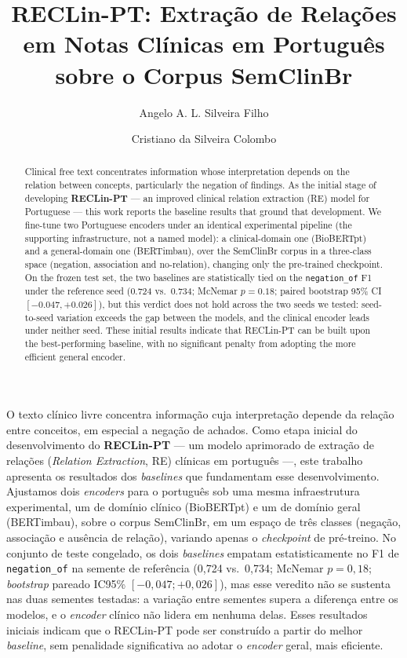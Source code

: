 \documentclass[12pt]{article}
\title{RECLin-PT: Extração de Relações em Notas Clínicas em Português sobre o
Corpus SemClinBr}
\author{Angelo A. L. Silveira Filho\inst{1} \and Cristiano da Silveira
Colombo\inst{1}}
\begin{document}
\maketitle

\begin{abstract}
Clinical free text concentrates information whose interpretation depends on the
relation between concepts, particularly the negation of findings. As the initial
stage of developing \textbf{RECLin-PT} --- an improved clinical relation
extraction (RE) model for Portuguese --- this work reports the baseline results
that ground that development. We fine-tune two Portuguese encoders under an
identical experimental pipeline (the supporting infrastructure, not a named
model): a clinical-domain one (BioBERTpt) and a general-domain one (BERTimbau),
over the SemClinBr corpus in a three-class space (negation, association and
no-relation), changing only the pre-trained checkpoint. On the frozen test set,
the two baselines are statistically tied on the \texttt{negation\_of} F1 under the
reference seed (0.724 vs.\ 0.734; McNemar $p=0.18$; paired bootstrap 95\% CI
$[-0.047,+0.026]$), but this verdict does not hold across the two seeds we tested:
seed-to-seed variation exceeds the gap between the models, and the clinical
encoder leads under neither seed. These initial results
indicate that RECLin-PT can be built upon the best-performing baseline, with no
significant penalty from adopting the more efficient general encoder.
\end{abstract}

\begin{resumo}
O texto clínico livre concentra informação cuja interpretação depende da relação
entre conceitos, em especial a negação de achados. Como etapa inicial do
desenvolvimento do \textbf{RECLin-PT} --- um modelo aprimorado de extração de
relações (\emph{Relation Extraction}, RE) clínicas em português ---, este
trabalho apresenta os resultados dos \emph{baselines} que fundamentam esse
desenvolvimento. Ajustamos dois \emph{encoders} para o português sob uma mesma
infraestrutura experimental, um de domínio clínico (BioBERTpt) e um de domínio
geral (BERTimbau), sobre o corpus SemClinBr, em um espaço de três classes
(negação, associação e ausência de relação), variando apenas o \emph{checkpoint}
de pré-treino. No conjunto de teste congelado, os dois \emph{baselines} empatam
estatisticamente no F1 de \texttt{negation\_of} na semente de referência (0,724
vs.\ 0,734; McNemar $p=0,18$; \emph{bootstrap} pareado IC95\% $[-0,047;+0,026]$),
mas esse veredito não se sustenta nas duas sementes testadas: a variação entre
sementes supera a diferença entre os modelos, e o \emph{encoder} clínico não
lidera em nenhuma delas. Esses resultados iniciais indicam que o
RECLin-PT pode ser construído a partir do melhor \emph{baseline}, sem penalidade
significativa ao adotar o \emph{encoder} geral, mais eficiente.
\end{resumo}
\end{document}
